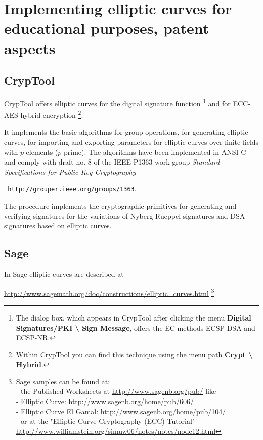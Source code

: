 \section{Implementing elliptic curves for educational purposes, pat\-ent aspects}


\subsection{CrypTool}

CrypTool offers elliptic curves for the digital signature function%
\footnote{%
The dialog box, which appears in CrypTool after clicking the menu
{\bf Digital Signatures/PKI \textbackslash{} Sign Message},
offers the EC methods ECSP-DSA and ECSP-NR.
} and for ECC-AES hybrid encryption%
\footnote{%
Within CrypTool you can find this technique using the menu
path {\bf Crypt \textbackslash{} Hybrid}.
}.

It implements the basic algorithms for group operations, for generating elliptic
curves, for importing and exporting parameters for elliptic curves over finite
fields with $p$ elements ($p$ prime). The algorithms have been implemented in
ANSI C and comply with draft no. 8 of the IEEE P1363 work group {\em Standard
Specifications for Public Key Cryptography}

{\href{http://grouper.ieee.org/groups/1363}{\tt
http://grouper.ieee.org/groups/1363}}.

The procedure implements the cryptographic primitives for generating and
verifying signatures for the variations of Nyberg-Rueppel signatures and
 DSA signatures based on elliptic curves.


\subsection{Sage}
\label{ec:Sage_Massierer}

In Sage elliptic curves are described at

\url{http://www.sagemath.org/doc/constructions/elliptic_curves.html}%
\footnote{%
Sage samples can be found at:\\
- the Published Worksheets at \url{http://www.sagenb.org/pub/} like\\
- Elliptic Curve: \url{http://www.sagenb.org/home/pub/606/} \\
- Elliptic Curve El Gamal: \url{http://www.sagenb.org/home/pub/104/} \\
- or at the "Elliptic Curve Cryptography (ECC) Tutorial"\\
  \url{http://www.williamstein.org/simuw06/notes/notes/node12.html}
}.


